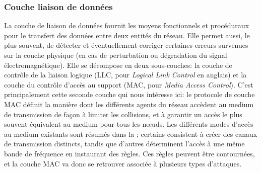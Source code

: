     \subsubsection{Couche liaison de données}
La couche de liaison de données fournit les moyens fonctionnels et procéduraux pour le transfert des données entre deux entités du réseau.
Elle permet aussi, le plus souvent, de détecter et éventuellement corriger certaines erreurs survenues sur la couche physique (en cas de perturbation ou dégradation du signal électromagnétique).
Elle se décompose en deux sous-couches: la couche de contrôle de la liaison logique (LLC, pour \textit{Logical Link Control} en anglais) et la couche du contrôle d'accès au support (MAC, pour \textit{Media Access Control}).
C'est principalement cette seconde couche qui nous intéresse ici: le protocole de couche MAC définit la manière dont les différents agents du réseau accèdent au medium de transmission de façon à limiter les collisions, et à garantir un accès le plus souvent équivalent au medium pour tous les nœuds.
Les différents modes d'accès au medium existants sont résumés dans la ; certains consistent à créer des canaux de transmission distincts, tandis que d'autres déterminent l'accès à une même bande de fréquence en instaurant des règles.
Ces règles peuvent être contournées, et la couche MAC va donc se retrouver associée à plusieurs types d'attaques.

